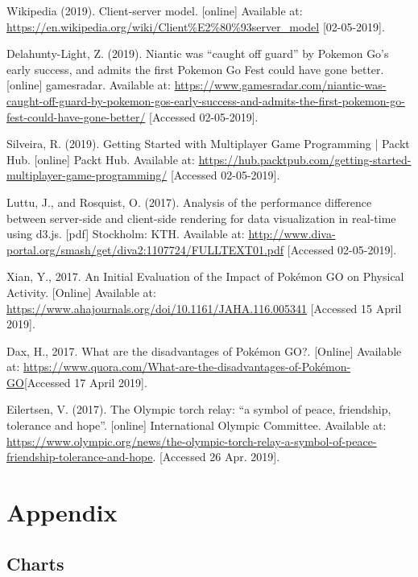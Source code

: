 \documentclass[12pt,a4paper,twoside]{report}
\begin{document}
\begin{thebibliography}{widestlabel}
Wikipedia (2019). Client-server model. [online] Available at: \url{https://en.wikipedia.org/wiki/Client%E2%80%93server_model} [02-05-2019].

Delahunty-Light, Z. (2019). Niantic was “caught off guard” by Pokemon Go’s early success, and admits the first Pokemon Go Fest could have gone better. [online] gamesradar. Available at: \url{https://www.gamesradar.com/niantic-was-caught-off-guard-by-pokemon-gos-early-success-and-admits-the-first-pokemon-go-fest-could-have-gone-better/} [Accessed 02-05-2019].

Silveira, R. (2019). Getting Started with Multiplayer Game Programming | Packt Hub. [online] Packt Hub. Available at: \url{https://hub.packtpub.com/getting-started-multiplayer-game-programming/} [Accessed 02-05-2019].

Luttu, J., and Rosquist, O. (2017). Analysis of the performance difference between server-side and client-side rendering for data visualization in real-time using d3.js. [pdf] Stockholm: KTH. Available at:  \url{http://www.diva-portal.org/smash/get/diva2:1107724/FULLTEXT01.pdf} [Accessed 02-05-2019].

Xian, Y., 2017. An Initial Evaluation of the Impact of Pokémon GO on Physical Activity. [Online] Available at: \url{https://www.ahajournals.org/doi/10.1161/JAHA.116.005341} [Accessed 15 April 2019].

Dax, H., 2017. What are the disadvantages of Pokémon GO?. [Online] Available at: \url {https://www.quora.com/What-are-the-disadvantages-of-Pokémon-GO}[Accessed 17 April 2019].

Eilertsen, V. (2017). The Olympic torch relay: “a symbol of peace, friendship, tolerance and hope”. [online] International Olympic Committee. Available at: \url{https://www.olympic.org/news/the-olympic-torch-relay-a-symbol-of-peace-friendship-tolerance-and-hope}. [Accessed 26 Apr. 2019].


\newpage
\section{Appendix}

\subsection{Charts}


\end{thebibliography}
\end{document}
